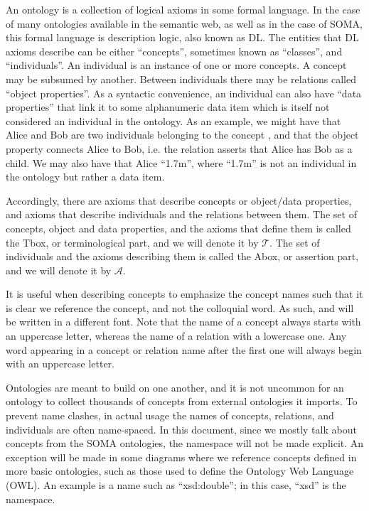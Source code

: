 An ontology is a collection of logical axioms in some formal language. In the case of many ontologies available in the semantic web, as well as in the case of SOMA, this formal language is description logic, also known as DL. The entities that DL axioms describe can be either ``concepts'', sometimes known as ``classes'', and   ``individuals''. An individual is an instance of one or more concepts. A concept may be subsumed by another. Between individuals there may be relations called ``object properties''. As a syntactic convenience, an individual can also have ``data properties'' that link it to some alphanumeric data item which is itself not considered an individual in the ontology. As an example, we might have that Alice and Bob are two individuals belonging to the concept , and that the object property  connects Alice to Bob, i.e. the relation asserts that Alice has Bob as a child. We may also have that Alice  ``1.7m'', where ``1.7m'' is not an individual in the ontology but rather a data item.

Accordingly, there are axioms that describe concepts or object/data properties, and axioms that describe individuals and the relations between them. The set of concepts, object and data properties, and the axioms that define them is called the Tbox, or terminological part, and we will denote it by $\mathcal{T}$. The set of individuals and the axioms describing them is called the Abox, or assertion part, and we will denote it by $\mathcal{A}$.

It is useful when describing concepts to emphasize the concept names such that it is clear we reference the concept, and not the colloquial word. As such,  and  will be written in a different font. Note that the name of a concept always starts with an uppercase letter, whereas the name of a relation with a lowercase one. Any word appearing in a concept or relation name after the first one will always begin with an uppercase letter.

Ontologies are meant to build on one another, and it is not uncommon for an ontology to collect thousands of concepts from external ontologies it imports. To prevent name clashes, in actual usage the names of concepts, relations, and individuals are often name-spaced. In this document, since we mostly talk about concepts from the SOMA ontologies, the namespace will not be made explicit. An exception will be made in some diagrams where we reference concepts defined in more basic ontologies, such as those used to define the Ontology Web Language (OWL). An example is a name such as ``xsd:double''; in this case, ``xsd'' is the namespace.


